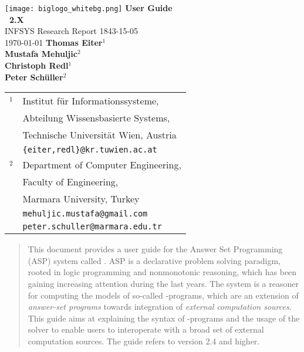 \documentclass[a4paper, titlepage]{article}
\begin{document}
\begin{titlepage}
    \centering
    \vfill
    \texttt{[image: biglogo\_whitebg.png]}
    \vskip2cm
        {\bfseries\Huge User Guide} \\[1em]
        {\bfseries\Huge \dlvhex\ 2.X} \\
        \vskip1.0cm
        {\sc\Large INFSYS Research Report 1843-15-05} \\
        \medskip
        {\Large \today}        
        \vskip2cm
        {\bfseries\Large
        Thomas Eiter$^1$\\[2mm]
        Mustafa Mehuljic$^2$ \\[2mm] %
        Christoph Redl$^1$ \\[2mm]
        Peter Sch\"{u}ller$^2$ \\[2mm]
        }    
        \vspace{1cm}
        \begin{tabular}{r@{}l}
        {\Large$^1$}
          & Institut f\"ur Informationssysteme,\\
          & Abteilung Wissensbasierte Systems,\\
          & Technische Universit\"at Wien, Austria \\
          & {\tt\{eiter,redl\}@kr.tuwien.ac.at} \\[1ex]
        {\Large$^2$}
          & Department of Computer Engineering,\\
          & Faculty of Engineering, \\
          & Marmara University, Turkey \\
          & {\tt mehuljic.mustafa@gmail.com}\\
          & {\tt peter.schuller@marmara.edu.tr}
        \end{tabular}
        \vspace{4cm}
\end{titlepage}
%
%
\begin{abstract}
This document provides a user guide for the Answer Set 
Programming (ASP) system called \dlvhex{}.
ASP is a declarative 
problem solving paradigm, rooted in logic programming and 
nonmonotonic reasoning, which has been gaining increasing 
attention during the last years. The \dlvhex{} system is a 
reasoner for computing the models of so-called \hex{}-programs, which are an extension of \emph{answer-set 
programs} towards integration of \emph{external computation 
sources}. This guide aims at explaining the syntax
of \hex{}-programs and the usage of the \dlvhex{} solver
to enable users 
to interoperate with a broad set of external computation 
sources. The guide refers to version 2.4 and higher.
\end{abstract}
\end{document}
